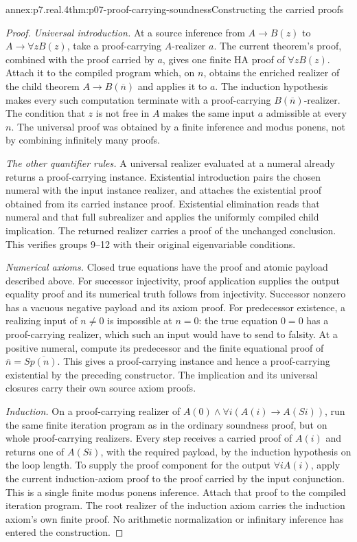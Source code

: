 \begin{annexitem}{annex:p7.real.4}{thm:p07-proof-carrying-soundness}{Constructing the carried proofs}
\begin{proof}
\emph{Universal introduction.} At a source inference from
\(A\to B(z)\) to \(A\to\forall zB(z)\), take a proof-carrying
\(A\)-realizer \(a\). The current theorem's proof, combined with
the proof carried by \(a\), gives one finite HA proof of
\(\forall zB(z)\). Attach it to the compiled program which, on
\(n\), obtains the enriched realizer of the child theorem
\(A\to B(\overline n)\) and applies it to \(a\). The induction
hypothesis makes every such computation terminate with a
proof-carrying \(B(\overline n)\)-realizer. The condition that
\(z\) is not free in \(A\) makes the same input \(a\) admissible
at every \(n\). The universal proof was obtained by a finite
inference and modus ponens, not by combining infinitely many proofs.

\emph{The other quantifier rules.} A universal realizer evaluated at
a numeral already returns a proof-carrying instance. Existential
introduction pairs the chosen numeral with the input instance realizer,
and attaches the existential proof obtained from its carried instance
proof. Existential elimination reads that numeral and that full
subrealizer and applies the uniformly compiled child implication.
The returned realizer carries a proof of the unchanged conclusion.
This verifies groups 9--12 with their original eigenvariable conditions.

\emph{Numerical axioms.} Closed true equations have the proof and
atomic payload described above. For successor injectivity, proof
application supplies the output equality proof and its numerical
truth follows from injectivity. Successor nonzero has a vacuous
negative payload and its axiom proof. For predecessor existence,
a realizing input of \(n\ne0\) is impossible at \(n=0\): the
true equation \(0=0\) has a proof-carrying realizer, which such an
input would have to send to falsity. At a positive numeral, compute
its predecessor and the finite equational proof of
\(\overline n=S\overline{p(n)}\). This gives a proof-carrying
instance and hence a proof-carrying existential by the preceding
constructor. The implication and its universal closures carry their
own source axiom proofs.

\emph{Induction.} On a proof-carrying realizer of
\(A(0)\land\forall i(A(i)\to A(Si))\), run the same finite
iteration program as in the ordinary soundness proof, but on whole
proof-carrying realizers. Every step receives a carried proof of
\(A(i)\) and returns one of \(A(Si)\), with the required payload,
by the induction hypothesis on the loop length. To supply the proof
component for the output \(\forall iA(i)\), apply the current
induction-axiom proof to the proof carried by the input conjunction.
This is a single finite modus ponens inference. Attach that proof to
the compiled iteration program. The root realizer of the induction
axiom carries the induction axiom's own finite proof. No arithmetic
normalization or infinitary inference has entered the construction.


\end{proof}
\end{annexitem}

